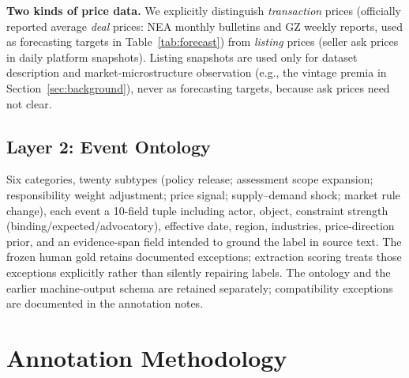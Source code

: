 \documentclass[sigconf,anonymous,review]{acmart}
\begin{document}
\textbf{Two kinds of price data.} We explicitly distinguish \emph{transaction} prices (officially reported average \emph{deal} prices: NEA monthly bulletins and GZ weekly reports, used as forecasting targets in Table~\ref{tab:forecast}) from \emph{listing} prices (seller ask prices in daily platform snapshots). Listing snapshots are used only for dataset description and market-microstructure observation (e.g., the vintage premia in Section~\ref{sec:background}), never as forecasting targets, because ask prices need not clear.

\subsection{Layer 2: Event Ontology}
Six categories, twenty subtypes (policy release; assessment scope expansion; responsibility weight adjustment; price signal; supply--demand shock; market rule change), each event a 10-field tuple including actor, object, constraint strength (binding\slash expected\slash advocatory), effective date, region, industries, price-direction prior, and an evidence-span field intended to ground the label in source text. The frozen human gold retains documented exceptions; extraction scoring treats those exceptions explicitly rather than silently repairing labels. The ontology and the earlier machine-output schema are retained separately; compatibility exceptions are documented in the annotation notes.

\section{Annotation Methodology}
\label{sec:annotation}
\end{document}
